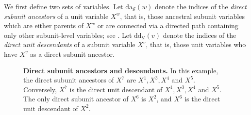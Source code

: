 \documentclass[12pt]{article}
\newcommand{\dd}{\mathrm{dd}}
\newcommand{\da}{\mathrm{da}}
\begin{document}
We first define two sets of variables. Let $\da_\mathcal{S}(w)$ denote the indices of the \textit{direct
subunit ancestors} of a unit variable $X^w$, that is, those ancestral subunit
variables which are either parents of $X^w$ or are connected via a
directed path containing only other subunit-level variables; see
.  Let $\dd_{\mathcal{U}}(v)$ denote the
indices of the \textit{direct unit descendants} of a subunit variable $X^v$, that is, those
unit variables who have $X^v$ as a direct subunit ancestor.

\begin{figure}[t]
\centering
{}
\caption{\textbf{Direct subunit ancestors and descendants.} In this example, the direct subunit ancestors of $X^{7}$ are $X^{1},X^{3},X^{4}$ and $X^{5}$. Conversely, $X^7$ is the direct unit descendant of $X^{1},X^{3},X^{4}$ and $X^{5}$. The only direct subunit ancestor of $X^6$ is $X^2$, and $X^6$ is the direct unit descendant of $X^2$.} \label{fig:direct_ancestor_ex}
\end{figure}
\end{document}
